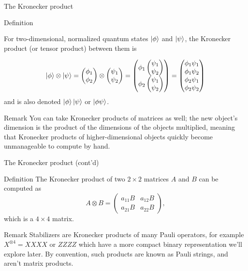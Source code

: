 \documentclass{beamer}
\begin{document}
\begin{frame}{The Kronecker product}

\begin{block}{Definition}
    
For two-dimensional, normalized quantum states $\ket\phi$ and $\ket\psi$, the Kronecker product (or tensor product) between them is

$$ \ket\phi  \otimes \ket\psi = \begin{pmatrix} \phi_1 \\ \phi_2 \end{pmatrix} \otimes \begin{pmatrix} \psi_1 \\ \psi_2 \end{pmatrix} = \begin{pmatrix}
    \phi_1 \begin{pmatrix}\psi_1 \\ \psi_2 \end{pmatrix} \\
    \phi_2 \begin{pmatrix}\psi_1 \\ \psi_2 \end{pmatrix}
\end{pmatrix} =
\begin{pmatrix}
    \phi_1\psi_1 \\
    \phi_1\psi_2 \\
    \phi_2\psi_1 \\
    \phi_2\psi_2
\end{pmatrix}
$$
and is also denoted $\ket\phi\ket\psi$ or $\ket{\phi\psi}$.
\end{block}

\begin{block}{Remark}
You can take Kronecker products of matrices as well; the new object's dimension is the product of the dimensions of the objects multiplied, meaning that Kronecker products of higher-dimensional objects quickly become unmanageable to compute by hand.
\end{block}

\end{frame}

\begin{frame}{The Kronecker product (cont'd)}
    \begin{block}{Definition}
        The Kronecker product of two $2\times 2$ matrices $A$ and $B$ can be computed as
        $$ A \otimes B = \begin{pmatrix}
            a_{11} B & a_{12}B \\ a_{21}B & a_{22}B
        \end{pmatrix}, $$ which is a $4\times4$ matrix.
    \end{block}

    \begin{block}{Remark}
        Stabilizers are Kronecker products of many Pauli operators, for example $X^{\otimes 4} = XXXX$ or $ZZZZ$ which have a more compact binary representation we'll explore later. By convention, such products are known as Pauli strings, and aren't matrix products.
    \end{block}
\end{frame}
\end{document}
